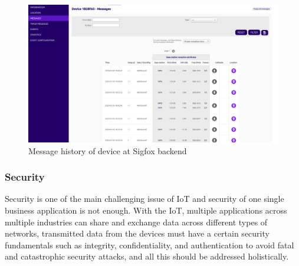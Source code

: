 \documentclass[12pt]{article}
\begin{document}
\begin{figure}[h]
    \centering
    \includegraphics[width=0.8\columnwidth]{Images/sigfoxHistory.pdf}
    \caption{Message history of device at Sigfox backend}
    \label{fig:Device's message history at Sigfox backend}
\end{figure}



\subsubsection{Security}\label{Sigfox Security}
Security is one of the main challenging issue of IoT and security of one single business application is not enough. With the IoT, multiple applications
across multiple industries can share and exchange data across
different types of networks, transmitted data from the devices must have a certain security fundamentals such as integrity, confidentiality, and authentication to avoid fatal and catastrophic security attacks, and  all this should be addressed holistically.\par

\end{document}
